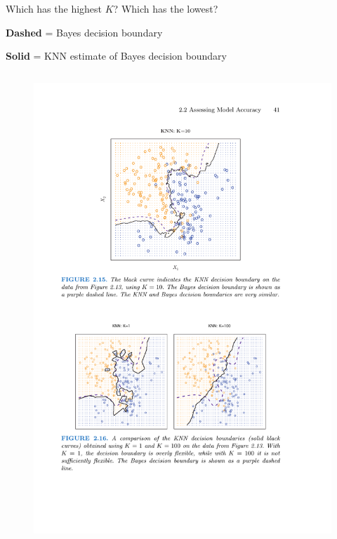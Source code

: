 \documentclass[aspectratio=169]{beamer}
\begin{document}
\begin{frame}{Which has the highest $K$?  Which has the lowest?}

\textbf{Dashed} = Bayes decision boundary

\textbf{Solid} = KNN estimate of Bayes decision boundary
\begin{columns}
\begin{figure}
\includegraphics[width=\textwidth]{KNN_k10}
\caption*{}
\end{figure}


\end{columns}
\end{frame}
\end{document}
